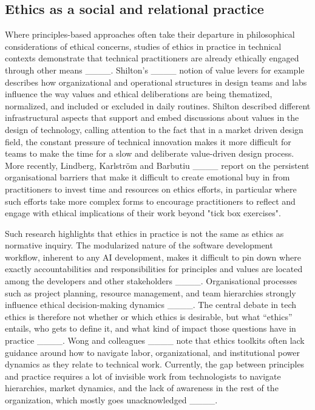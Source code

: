 \subsection{Ethics as a social and relational practice}
Where principles-based approaches often take their departure in philosophical considerations of ethical concerns, studies of ethics in practice in technical contexts demonstrate that technical practitioners are already ethically engaged through other means ____. Shilton’s ____ notion of value levers for example describes how organizational and operational structures in design teams and labs influence the way values and ethical deliberations are being thematized, normalized, and included or excluded in daily routines. Shilton described different infrastructural aspects that support and embed discussions about values in the design of technology, calling attention to the fact that in a market driven design field, the constant pressure of technical innovation makes it more difficult for teams to make the time for a slow and deliberate value-driven design process. More recently, Lindberg, Karlström and Barbutiu ____ report on the persistent organisational barriers that make it difficult to create emotional buy in from practitioners to invest time and resources on ethics efforts, in particular where such efforts take more complex forms to encourage practitioners to reflect and engage with ethical implications of their work beyond "tick box exercises". 

Such research highlights that ethics in practice is not the same as ethics as normative inquiry. The modularized nature of the software development workflow, inherent to any AI development, makes it difficult to pin down where exactly accountabilities and responsibilities for principles and values are located among the developers and other stakeholders ____. Organisational processes such as project planning, resource management, and team hierarchies strongly influence ethical decision-making dynamics ____. The central debate in tech ethics is therefore not whether or which ethics is desirable, but what “ethics” entails, who gets to define it, and what kind of impact those questions have in practice ____. Wong and colleagues ____ note that ethics toolkits often lack guidance around how to navigate labor, organizational, and institutional power dynamics as they relate to technical work. Currently, the gap between principles and practice requires a lot of invisible work from technologists to navigate hierarchies, market dynamics, and the lack of awareness in the rest of the organization, which mostly goes unacknowledged ____. 

